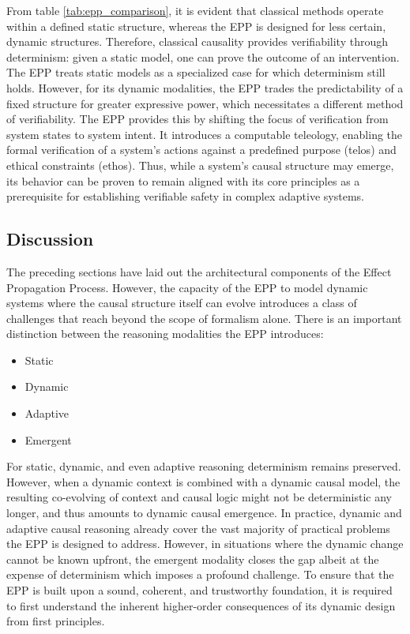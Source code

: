 From table \ref{tab:epp_comparison}, it is evident that classical methods operate within a defined static structure, whereas the EPP is designed for less certain, dynamic structures. Therefore, classical causality provides verifiability through determinism: given a static model, one can prove the outcome of an intervention. The EPP treats static models as a specialized case for which determinism still holds. However, for its dynamic modalities, the EPP trades the predictability of a fixed structure for greater expressive power, which necessitates a different method of verifiability. The EPP provides this by shifting the focus of verification from system states to system intent. It introduces a computable teleology, enabling the formal verification of a system's actions against a predefined purpose (telos) and ethical constraints (ethos). Thus, while a system's causal structure may emerge, its behavior can be proven to remain aligned with its core principles as a prerequisite for establishing verifiable safety in complex adaptive systems.


\subsection{Discussion}
\label{sec:epp_discussion}

The preceding sections have laid out the architectural components of the Effect Propagation Process. However, the capacity of the EPP to model dynamic systems where the causal structure itself can evolve introduces a class of challenges that reach beyond the scope of formalism alone. There is an important distinction between the reasoning modalities the EPP introduces:

\begin{itemize}
	\item Static
	\item Dynamic
	\item Adaptive 
	\item Emergent 
\end{itemize}

For static, dynamic, and even adaptive reasoning determinism remains preserved. However, when a dynamic context is combined with a dynamic causal model, the resulting co-evolving of context and causal logic might not be deterministic any longer, and thus amounts to dynamic causal emergence. In practice, dynamic and adaptive causal reasoning already cover the vast majority of practical problems the EPP is designed to address. However, in situations where the dynamic change cannot be known upfront, the emergent modality closes the gap albeit at the expense of determinism which imposes a profound challenge. To ensure that the EPP is built upon a sound, coherent, and trustworthy foundation, it is required to first understand the inherent higher-order consequences of its dynamic design from first principles.

